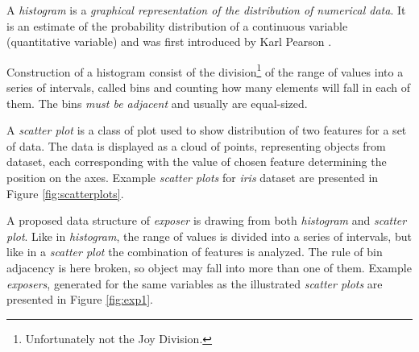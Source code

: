 \documentclass[]{article}
\begin{document}
A \emph{histogram} is a \emph{graphical representation of the distribution of numerical data}. It is an estimate of the probability distribution of a continuous variable (quantitative variable) and was first introduced by Karl Pearson \cite{1895RSPTA.186..343P}. 

Construction of a histogram consist of the division\footnote{Unfortunately not the Joy Division.} of the range of values into a series of intervals, called bins and counting how many elements will fall in each of them. The bins \emph{must be adjacent} and usually are equal-sized.

A \emph{scatter plot} is a class of plot used to show distribution of two features for a set of data. The data is displayed as a cloud of points, representing objects from dataset, each corresponding with the value of chosen feature determining the position on the axes.\cite{jessica2005seeing} Example \emph{scatter plots} for \emph{iris} dataset are presented in Figure \ref{fig:scatterplots}.

A proposed data structure of \emph{exposer} is drawing from both \emph{histogram} and \emph{scatter plot}. Like in \emph{histogram}, the range of values is divided into a series of intervals, but like in a \emph{scatter plot} the combination of features is analyzed. The rule of bin adjacency is here broken, so object may fall into more than one of them. Example \emph{exposers}, generated for the same variables as the illustrated \emph{scatter plots} are presented in Figure \ref{fig:exp1}.
\end{document}
